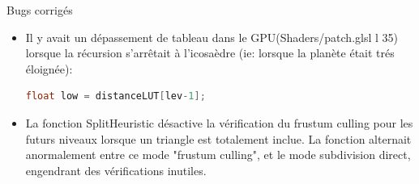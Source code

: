 
\begin{frame}[fragile]{Bugs corrigés}{}
\begin{itemize}
    \item 
    Il y avait un dépassement de tableau dans le GPU(Shaders/patch.glsl l 35) lorsque la récursion s'arrêtait à l'icosaèdre (ie: lorsque la planète était trés éloignée):
\begin{lstlisting}[language=c++]
float low = distanceLUT[lev-1];
\end{lstlisting}
    \item
    La fonction SplitHeuristic désactive la vérification du frustum culling pour les futurs niveaux lorsque un triangle est totalement inclue. La fonction alternait anormalement entre ce mode "frustum culling", et le mode subdivision direct, engendrant des vérifications inutiles.
    
\end{itemize}


        
  \end{frame}
